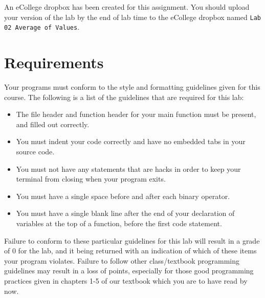 \documentclass[11pt]{article}
\begin{document}
An eCollege dropbox has been created for this assignment.  You should upload your version of the lab by the
end of lab time to the eCollege dropbox named \verb~Lab 02 Average of Values~.
\section*{Requirements}
\label{sec-5}

Your programs must conform to the style and formatting guidelines given for this course.
The following is a list of the guidelines that are required for this lab:

\begin{itemize}
\item The file header and function header for your main function must be present, and filled out correctly.
\item You must indent your code correctly and have no embedded tabs in your source code.
\item You must not have any statements that are hacks in order to keep your terminal from closing when your program exits.
\item You must have a single space before and after each binary operator.
\item You must have a single blank line after the end of your declaration of variables at the top of a function, before the first code statement.
\end{itemize}

Failure to conform to these particular guidelines for this lab will
result in a grade of 0 for the lab, and it being returned with an
indication of which of these items your program violates.  Failure to
follow other class/textbook programming guidelines may result in a
loss of points, especially for those good programming practices given
in chapters 1-5 of our textbook which you are to have read by now.
\end{document}
